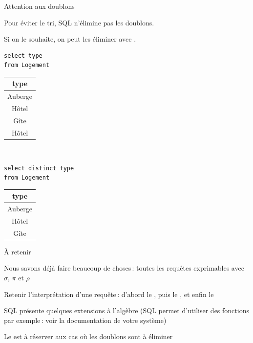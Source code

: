 \begin{frame}[fragile]{Attention aux doublons}


Pour éviter le tri, SQL n'élimine pas les doublons.

\vfill


Si on le souhaite, on peut les éliminer
avec  .


\vfill

\begin{center}
\begin{minipage}[b]{4cm}
\begin{verbatim}
select type 
from Logement
\end{verbatim}

\begin{tabular}{c}
\textbf{type}\\ \hline 
Auberge\\ \hline 
Hôtel\\ \hline 
Gîte\\ \hline 
Hôtel\\ \hline 
\end{tabular}
\end{minipage} \hspace*{1cm} \
\begin{minipage}[b]{4cm}
\begin{verbatim}
select distinct type 
from Logement
\end{verbatim}

\begin{tabular}{c}
\textbf{type}\\ \hline 
Auberge\\ \hline 
Hôtel\\ \hline 
Gîte\\ \hline 
\end{tabular}
\end{minipage}
\end{center}

\end{frame}


\begin{frame}{À retenir}

Nous savons déjà faire beaucoup de choses\,: toutes
les requêtes exprimables avec $\sigma$, $\pi$ et $\rho$

\vfill

\begin{redbullet}
  \item Retenir l'interprétation d'une requête\,: d'abord
  le   , puis le , et enfin le 
  \item SQL présente quelques extensions à l'algèbre (SQL permet d'utiliser des 
    fonctions par
exemple\,: voir la documentation de votre système)
  \item Le  est à réserver aux cas où les doublons
  sont à éliminer
\end{redbullet}

\end{frame}

